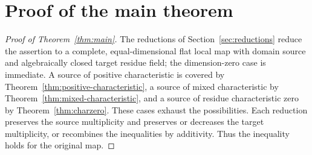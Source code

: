 \documentclass[11pt]{article}
\numberwithin{equation}{section}
\theoremstyle{definition}
\begin{document}
\section{Proof of the main theorem}\label{sec:assembly}
\begin{proof}[Proof of Theorem~\ref{thm:main}]
The reductions of Section~\ref{sec:reductions} reduce the assertion to
a complete, equal-dimensional flat local map with domain source and
algebraically closed target residue field; the dimension-zero case is
immediate. A source of positive characteristic is covered by
Theorem~\ref{thm:positive-characteristic}, a source of mixed
characteristic by Theorem~\ref{thm:mixed-characteristic}, and a source
of residue characteristic zero by Theorem~\ref{thm:charzero}.
These cases exhaust the possibilities. Each reduction preserves the
source multiplicity and preserves or decreases the target multiplicity,
or recombines the inequalities by additivity. Thus the inequality holds
for the original map.
\end{proof}


\end{document}

